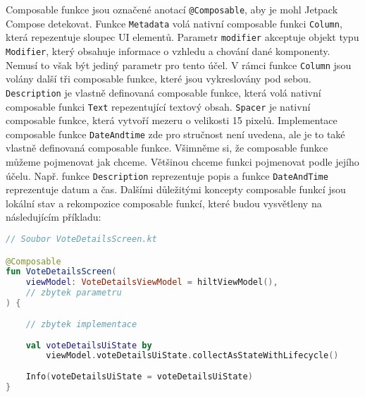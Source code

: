 \noindent Composable funkce jsou označené anotací \lstinline|@Composable|, aby je mohl Jetpack Compose detekovat. Funkce \lstinline|Metadata| volá nativní composable funkci \lstinline|Column|, která repezentuje sloupec UI elementů. Parametr \lstinline|modifier| akceptuje objekt typu \lstinline|Modifier|, který obsahuje informace o vzhledu a chování dané komponenty. Nemusí to však být jediný parametr pro tento účel. V rámci funkce \lstinline|Column| jsou volány další tři composable funkce, které jsou vykreslovány pod sebou. \lstinline|Description| je vlastně definovaná composable funkce, která volá nativní composable funkci \lstinline|Text| repezentující textový obsah. \lstinline|Spacer| je nativní composable funkce, která vytvoří mezeru o velikosti 15 pixelů. Implementace composable funkce \lstinline|DateAndtime| zde pro stručnost není uvedena, ale je to také vlastně definovaná composable funkce. Všimněme si, že composable funkce můžeme pojmenovat jak chceme. Většinou chceme funkci pojmenovat podle jejího účelu. Např. funkce \lstinline|Description| reprezentuje popis a funkce \lstinline|DateAndTime| reprezentuje datum a čas. Dalšími důležitými koncepty composable funkcí jsou lokální stav a rekompozice composable funkcí, které budou vysvětleny na následujícím příkladu:

\begin{lstlisting}[caption={Ukázka composable funkce s vnitřním stavem}, label={lst:composable-example}, tabsize=2, language=Kotlin]
// Soubor VoteDetailsScreen.kt

@Composable
fun VoteDetailsScreen(
	viewModel: VoteDetailsViewModel = hiltViewModel(),
	// zbytek parametru
) {
	
	// zbytek implementace
	
	val voteDetailsUiState by 
		viewModel.voteDetailsUiState.collectAsStateWithLifecycle()
	
	Info(voteDetailsUiState = voteDetailsUiState)
}
\end{lstlisting}

